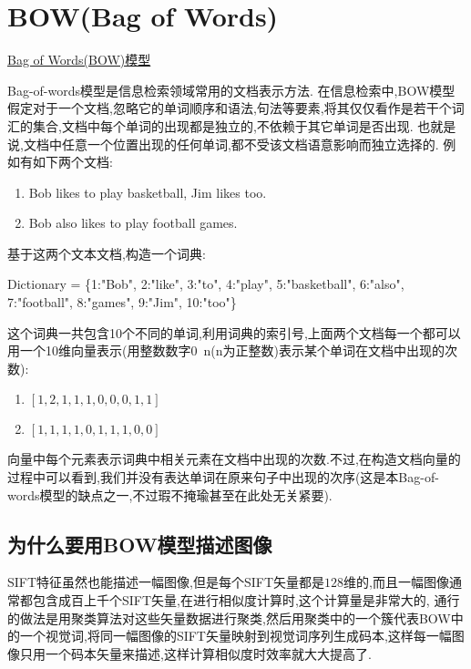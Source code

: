 \chapter{BOW(Bag of Words)}
\href{https://www.douban.com/note/310140053/}{Bag of Words(BOW)模型}

Bag-of-words模型是信息检索领域常用的文档表示方法. 在信息检索中,BOW模型假定对于一个文档,忽略它的单词顺序和语法,句法等要素,将其仅仅看作是若干个词汇的集合,文档中每个单词的出现都是独立的,不依赖于其它单词是否出现.
也就是说,文档中任意一个位置出现的任何单词,都不受该文档语意影响而独立选择的.
例如有如下两个文档:
\begin{enumerate}
	\item Bob likes to play basketball, Jim likes too.
	\item Bob also likes to play football games.
\end{enumerate}
基于这两个文本文档,构造一个词典:

Dictionary = \{1:"Bob", 2:"like", 3:"to", 4:"play", 5:"basketball", 6:"also", 7:"football", 8:"games", 9:"Jim", 10:"too"\}
 
这个词典一共包含10个不同的单词,利用词典的索引号,上面两个文档每一个都可以用一个10维向量表示(用整数数字0~n(n为正整数)表示某个单词在文档中出现的次数):
 
\begin{enumerate}
	\item $[1, 2, 1, 1, 1, 0, 0, 0, 1, 1]$
	\item $[1, 1, 1, 1 ,0, 1, 1, 1, 0, 0]$
\end{enumerate}
 
向量中每个元素表示词典中相关元素在文档中出现的次数.不过,在构造文档向量的过程中可以看到,我们并没有表达单词在原来句子中出现的次序(这是本Bag-of-words模型的缺点之一,不过瑕不掩瑜甚至在此处无关紧要).

\section{为什么要用BOW模型描述图像}
SIFT特征虽然也能描述一幅图像,但是每个SIFT矢量都是$128$维的,而且一幅图像通常都包含成百上千个SIFT矢量,在进行相似度计算时,这个计算量是非常大的,
通行的做法是用聚类算法对这些矢量数据进行聚类,然后用聚类中的一个簇代表BOW中的一个视觉词,将同一幅图像的SIFT矢量映射到视觉词序列生成码本,这样每一幅图像只用一个码本矢量来描述,这样计算相似度时效率就大大提高了.

